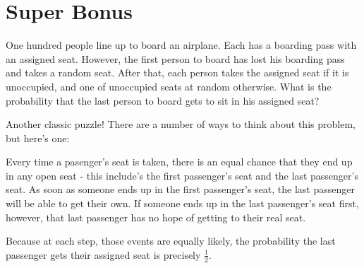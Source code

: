 \documentclass[11pt]{article}
\theoremstyle{definition}
\theoremstyle{remark}
\begin{document}
\section*{Super Bonus}
One hundred people line up to board an airplane. Each has a boarding pass with an assigned seat. However, the first person to board has lost his boarding pass and takes a random seat. After that, each person takes the assigned seat if it is unoccupied, and one of unoccupied seats at random otherwise. What is the probability that the last person to board gets to sit in his assigned seat?

{\color{red} Another classic puzzle! There are a number of ways to think about this problem, but here's one:

Every time a pasenger's seat is taken, there is an equal chance that they end up in any open seat - this include's the first passenger's seat and the last passenger's seat. As soon as someone ends up in the first passenger's seat, the last passenger will be able to get their own. If someone ends up in the last passenger's seat first, however, that last passenger has no hope of getting to their real seat.

Because at each step, those events are equally likely, the probability the last passenger gets their assigned seat is precisely $\frac{1}{2}$.}
\end{document}
